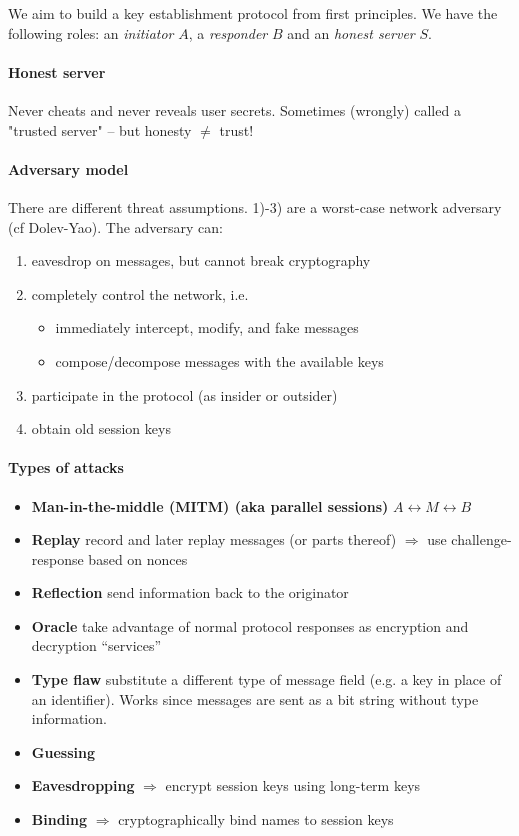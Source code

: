 We aim to build a key establishment protocol from first principles. We have the following roles:
an \textit{initiator} $A$, a \textit{responder} $B$ and an \textit{honest server} $S$.

\paragraph{Honest server} Never cheats and never reveals user secrets. Sometimes (wrongly) called a "trusted server" -- but honesty $\neq$ trust!

\paragraph{Adversary model} There are different threat assumptions. 1)-3) are a worst-case network adversary (cf Dolev-Yao). The adversary can:

\begin{enumerate}[label=\arabic*)]
    \item eavesdrop on messages, but cannot break cryptography
    \item completely control the network, i.e.
    \begin{itemize}[label=--]
        \item immediately intercept, modify, and fake messages
        \item compose/decompose messages with the available keys
    \end{itemize}
    \item participate in the protocol (as insider or outsider)
    \item obtain old session keys
\end{enumerate}

\paragraph{Types of attacks}
\begin{itemize}
    \item \textbf{Man-in-the-middle (MITM) (aka parallel sessions)} $A \leftrightarrow M \leftrightarrow B$
    \item\textbf{Replay} record and later replay messages (or parts thereof) $\Rightarrow$ use challenge-response based on nonces
    \item \textbf{Reflection} send information back to the originator
    \item \textbf{Oracle} take advantage of normal protocol responses as encryption and decryption “services”
    \item \textbf{Type flaw} substitute a different type of message field (e.g. a key in place of an identifier). Works since messages are sent as a bit string without type information. 
    \item \textbf{Guessing}
    \item \textbf{Eavesdropping} $\Rightarrow$ encrypt session keys using long-term keys
    \item \textbf{Binding} $\Rightarrow$ cryptographically bind names to session keys
\end{itemize}

